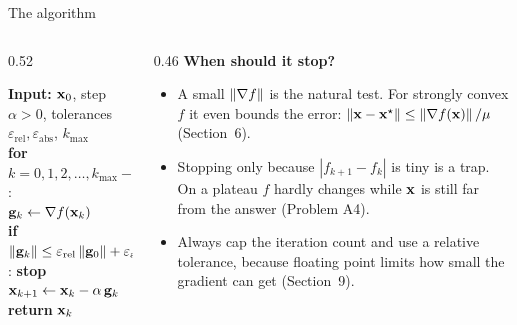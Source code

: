 \begin{frame}{The algorithm}
  \begin{columns}[T]
    \begin{column}{0.52\textwidth}
      \begin{thmbox}
        \small
        \textbf{Input:} $\mathbf{x}_0$, step $\alpha>0$, tolerances $\varepsilon_{\text{rel}},\varepsilon_{\text{abs}}$, $k_{\max}$\\[2pt]
        \textbf{for} $k = 0,1,2,\dots,k_{\max}-1$:\\
        \quad $\mathbf{g}_k \gets \nabla f(\mathbf{x}_k)$\\
        \quad \textbf{if} $\left\lVert \mathbf{g}_k \right\rVert\le\varepsilon_{\text{rel}}\left\lVert \mathbf{g}_0 \right\rVert+\varepsilon_{\text{abs}}$: \textbf{stop}\\
        \quad $\mathbf{x}_{k+1}\gets\mathbf{x}_k - \alpha\,\mathbf{g}_k$\\
        \textbf{return} $\mathbf{x}_k$
      \end{thmbox}
    \end{column}
    \begin{column}{0.46\textwidth}
      \small\textbf{When should it stop?}
      \begin{itemize}\footnotesize
        \item A small $\left\lVert \nabla f \right\rVert$ is the natural test. For strongly convex $f$ it even bounds the error:
              $\left\lVert \mathbf{x}-\mathbf{x}^\star \right\rVert\le\left\lVert \nabla f(\mathbf{x}) \right\rVert/\mu$ (Section~6).
        \item Stopping only because $|f_{k+1}-f_k|$ is tiny is a trap. On a plateau $f$ hardly changes
              while $\mathbf{x}$ is still far from the answer (Problem A4).
        \item Always cap the iteration count and use a relative tolerance, because floating point limits
              how small the gradient can get (Section~9).
      \end{itemize}
    \end{column}
  \end{columns}
\end{frame}

